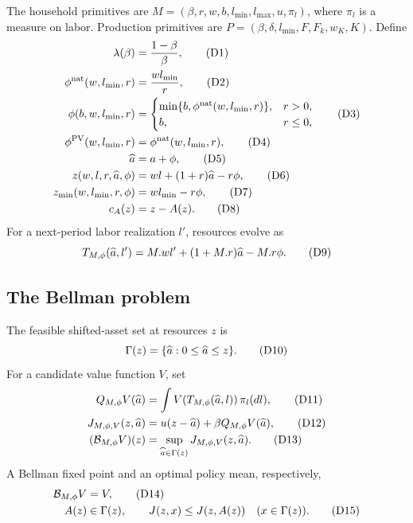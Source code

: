 \documentclass[11pt]{article}
\newcommand{\eqD}[1]{\refstepcounter{equation}\tag{D#1}}
\begin{document}
The household primitives are
\(M=(\beta,r,w,b,l_{\min},l_{\max},u,\pi_l)\), where \(\pi_l\) is a measure on
labor.  Production primitives are
\(P=(\beta,\delta,l_{\min},F,F_k,w_K,K)\).  Define
\begin{align}
 \lambda(\beta)&=\frac{1-\beta}{\beta}, \eqD{1}\label{D1}\\
 \phi^{\rm nat}(w,l_{\min},r)&=\frac{wl_{\min}}r, \eqD{2}\label{D2}\\
 \phi(b,w,l_{\min},r)&=
 \begin{cases}\min\{b,\phi^{\rm nat}(w,l_{\min},r)\},&r>0,\\b,&r\le0,
 \end{cases} \eqD{3}\label{D3}\\
 \phi^{\rm PV}(w,l_{\min},r)&=\phi^{\rm nat}(w,l_{\min},r), \eqD{4}\label{D4}\\
 \widehat a&=a+\phi, \eqD{5}\label{D5}\\
 z(w,l,r,\widehat a,\phi)&=wl+(1+r)\widehat a-r\phi, \eqD{6}\label{D6}\\
 z_{\min}(w,l_{\min},r,\phi)&=wl_{\min}-r\phi, \eqD{7}\label{D7}\\
 c_A(z)&=z-A(z). \eqD{8}\label{D8}
\end{align}
For a next-period labor realization \(l'\), resources evolve as
\begin{equation}
 T_{M,\phi}(\widehat a,l')=M.wl'+(1+M.r)\widehat a-M.r\phi.
 \eqD{9}\label{D9}
\end{equation}

\subsection{The Bellman problem}

The feasible shifted-asset set at resources \(z\) is
\begin{equation}
 \Gamma(z)=\{\widehat a:0\le \widehat a\le z\}. \eqD{10}\label{D10}
\end{equation}
For a candidate value function \(V\), set
\begin{align}
 Q_{M,\phi}V(\widehat a)
   &=\int V(T_{M,\phi}(\widehat a,l))\,\pi_l(dl), \eqD{11}\label{D11}\\
 J_{M,\phi,V}(z,\widehat a)
   &=u(z-\widehat a)+\beta Q_{M,\phi}V(\widehat a), \eqD{12}\label{D12}\\
 (\mathcal B_{M,\phi}V)(z)
   &=\sup_{\widehat a\in\Gamma(z)}J_{M,\phi,V}(z,\widehat a). \eqD{13}\label{D13}
\end{align}
A Bellman fixed point and an optimal policy mean, respectively,
\begin{align}
 \mathcal B_{M,\phi}V&=V, \eqD{14}\label{D14}\\
 A(z)&\in\Gamma(z),\qquad
 J(z,x)\le J(z,A(z))\quad(x\in\Gamma(z)). \eqD{15}\label{D15}
\end{align}
\end{document}
